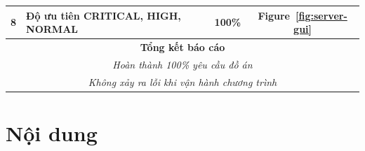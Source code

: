 \documentclass[a4paper,12pt]{report}
\begin{document}
\begin{center}
\begin{tabular}{|c|p{}|c|c|}
    8            & Độ ưu tiên CRITICAL, HIGH, NORMAL                                                                        & 100\%            & Figure~\ref{fig:server-gui} \\\hline
    \multicolumn{4}{|c|}{\textbf{Tổng kết báo cáo}}                                                                                                                          \\
    \multicolumn{4}{|c|}{\textsl{Hoàn thành 100\% yêu cầu đồ án}}                                                                                                            \\
    \multicolumn{4}{|c|}{\textsl{Không xảy ra lỗi khi vận hành chương trình}}                                                                                                \\\hline
  \end{tabular}
\end{center}

\pagebreak
\section{Nội dung}
\end{document}
